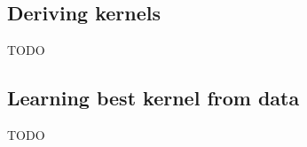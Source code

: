 \subsection{Deriving kernels \cite{deriving-kernels}}
TODO

\subsection{Learning best kernel from data \cite{choosing-kernels}}
TODO

% 
% 
% 
% 
% 
% 



% 
% 
% 
% 
